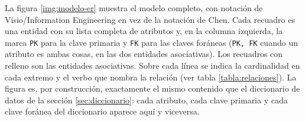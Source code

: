 \documentclass[10pt,a4paper]{article}
\begin{document}
La figura \ref{img:modelo-er} muestra el modelo completo, con notación de Visio/Information Engineering \cite{kendall2011} en vez de la notación de Chen. Cada recuadro es una entidad con su lista completa de atributos y, en la columna izquierda, la marca \texttt{PK} para la clave primaria y \texttt{FK} para las claves foráneas (\texttt{PK, FK} cuando un atributo es ambas cosas, en las dos entidades asociativas). Los recuadros con relleno son las entidades asociativas. Sobre cada línea se indica la cardinalidad en cada extremo y el verbo que nombra la relación (ver tabla \ref{tabla:relaciones}). La figura es, por construcción, exactamente el mismo contenido que el diccionario de datos de la sección \ref{sec:diccionario}: cada atributo, cada clave primaria y cada clave foránea del diccionario aparece aquí y viceversa.
\end{document}
